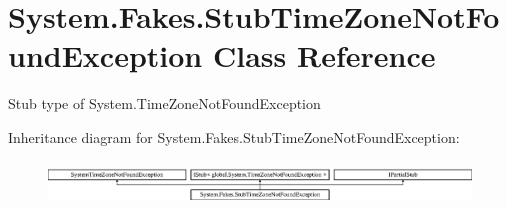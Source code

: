 \hypertarget{class_system_1_1_fakes_1_1_stub_time_zone_not_found_exception}{\section{System.\-Fakes.\-Stub\-Time\-Zone\-Not\-Found\-Exception Class Reference}
\label{class_system_1_1_fakes_1_1_stub_time_zone_not_found_exception}
}


Stub type of System.\-Time\-Zone\-Not\-Found\-Exception 


Inheritance diagram for System.\-Fakes.\-Stub\-Time\-Zone\-Not\-Found\-Exception\-:\begin{figure}[H]
\begin{center}
\leavevmode
\includegraphics[height=1.166667cm]{class_system_1_1_fakes_1_1_stub_time_zone_not_found_exception}
\end{center}
\end{figure}
